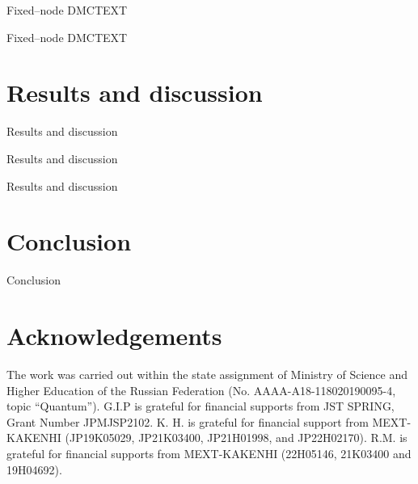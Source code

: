 \documentclass[aps,prb,groupedaddress,twocolumn,showpacs,dvipdfmx, superscriptaddress,pdftex]{revtex4-2}
\newcommand{\ghost}[1]{}
\begin{document}
\vspace{2mm}
Fixed--node DMCTEXT

\vspace{2mm}
Fixed--node DMCTEXT

\section{Results and discussion}
\label{sec.results}
Results and discussion


\vspace{2mm}
Results and discussion

\vspace{2mm}
Results and discussion

\section{Conclusion}
\label{sec.conc}
Conclusion


\section{Acknowledgements}
The work was carried out within the state assignment of Ministry of Science and Higher Education of the Russian Federation (No. AAAA-A18-118020190095-4, topic ``Quantum''). G.I.P is grateful for financial supports from JST SPRING, Grant Number JPMJSP2102. K. H. is grateful for financial support from MEXT-KAKENHI (JP19K05029, JP21K03400, JP21H01998, and JP22H02170). R.M. is grateful for financial supports from MEXT-KAKENHI (22H05146, 21K03400 and 19H04692).
\end{document}

